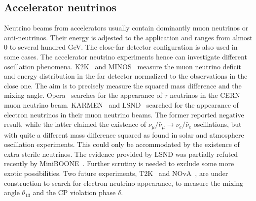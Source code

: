 \subsection{Accelerator  neutrinos}
\label{sec:acce}
Neutrino beams from accelerators usually contain dominantly muon neutrinos or anti-neutrinos. Their energy is adjested to the application and ranges from almost 0 to several hundred GeV. The close-far detector configuration is also used in some cases. The accelerator neutrino experiments hence can investigate different oscillation phenomena. K2K~\cite{K2K06} and MINOS~\cite{Min06} measure the muon neutrino deficit and energy distribution in the far detector normalized to the observations in the close one. The aim is to precisely measure the squared mass difference and the mixing angle. Opera~\cite{Ope06} searches for the appearance of $\tau$ neutrinos in the CERN muon neutrino beam. KARMEN~\cite{Kar03} and LSND~\cite{Dod06} searched for the appearance of electron neutrinos in their muon neutrino beams. The former reported negative result, while the latter claimed the existence of $\nu_{\mu}/\bar{\nu}_{\mu} \rightarrow \nu_{e}/\bar{\nu}_{e}$ oscillations, but with quite a different mass difference squared as found in solar and atmosphere oscillation experiments. This could only be accommodated by the existence of extra sterile neutrinos. The evidence provided by LSND was partially refuted recently by MiniBOONE~\cite{Agu07}. Further scrutiny is needed to exclude some more exotic possibilities. Two future experiments, T2K~\cite{T2K05} and NOvA~\cite{Nov05}, are under construction to search for electron neutrino appearance, to measure the mixing angle $\theta_{13}$ and the CP violation phase $\delta$.

